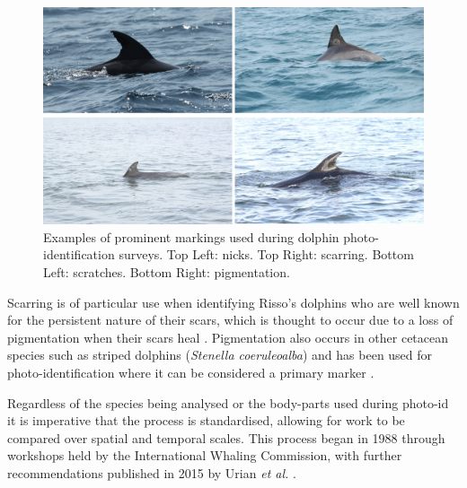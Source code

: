 \begin{figure}
	\begin{center}
		\includegraphics[scale=0.6]{Chapter2/figs/nicks-scarring-scratching-pigmentation.png}
	\end{center}
	\caption{Examples of prominent markings used during dolphin photo-identification surveys. Top Left: nicks. Top Right: scarring. Bottom Left: scratches. Bottom Right: pigmentation.
	}
	\label{fig:nicks-scarring-scratching-pigmentation}
\end{figure}

Scarring is of particular use when identifying Risso's dolphins who are well known for the persistent nature of their scars, which is thought to occur due to a loss of pigmentation when their scars heal \cite{mariani_analysis_2016}. Pigmentation also occurs in other cetacean species such as striped dolphins (\textit{Stenella coeruleoalba}) and has been used for photo-identification where it can be considered a primary marker \cite{rosso_colour_2008}.

Regardless of the species being analysed or the body-parts used during photo-id it is imperative that the process is standardised, allowing for work to be compared over spatial and temporal scales. This process began in 1988 through workshops held by the International Whaling Commission, with further recommendations published in 2015 by Urian \textit{et al.} \cite{hammond_individual_1990, urian_recommendations_2015}. 

